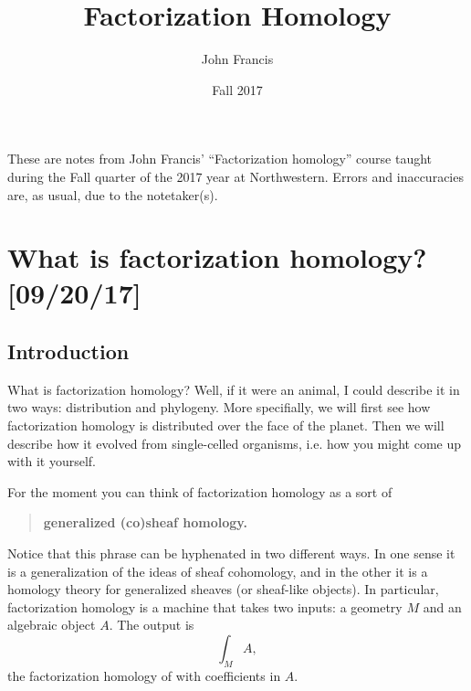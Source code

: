 \documentclass{amsart}
\title{Factorization Homology}
\author{John Francis}
\date{Fall 2017}
\begin{document}
\maketitle
\tableofcontents

These are notes from John Francis' ``Factorization homology'' course 
taught during the Fall quarter of the 2017 year at Northwestern. 
Errors and inaccuracies are, as usual, due to the notetaker(s).


\section{What is factorization homology? [09/20/17]}

\subsection{Introduction}

What is factorization homology? Well, if it were an animal, I could describe it in two ways:
distribution and phylogeny. More specifially, we will first see how factorization
homology is distributed over the face of the planet.
Then we will describe how it evolved from single-celled organisms, i.e. how you
might come up with it yourself.

For the moment you can think of factorization homology as a sort of 
\begin{quote}
    \textbf{generalized (co)sheaf homology.}
\end{quote}
Notice that this phrase can be hyphenated in two different ways. In one sense it is a
generalization of the ideas of sheaf cohomology, and in the other it is a homology theory
for generalized sheaves (or sheaf-like objects).
In particular, factorization homology is a machine that takes two inputs:
a geometry $M$ and an algebraic object $A$. The output is
\begin{equation*}
    \int_M A,
\end{equation*}
the factorization homology of with coefficients in $A$.
\end{document}
